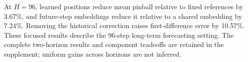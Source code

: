 At $H=96$, learned positions reduce mean pinball relative to fixed references by 3.67\%, and future-step embeddings reduce it relative to a shared embedding by 7.24\%. Removing the historical correction raises first-difference error by 10.57\%. These focused results describe the 96-step long-term forecasting setting. The complete two-horizon results and component tradeoffs are retained in the supplement; uniform gains across horizons are not inferred.

